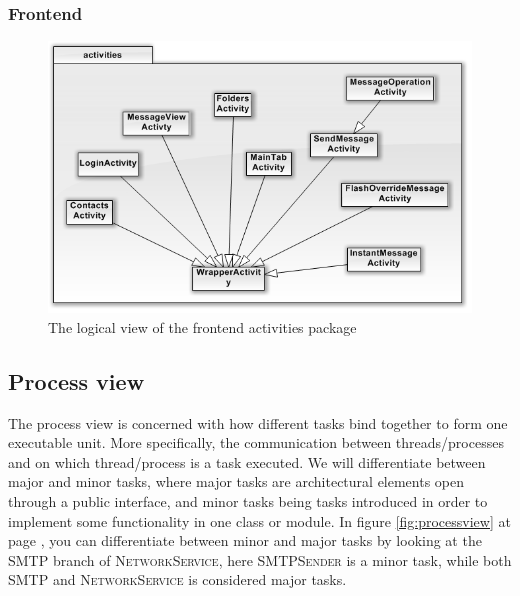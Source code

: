 \subsubsection{Frontend}
	\begin{figure}[H]
		\includegraphics[width=\textwidth]{FrontendClasses.png}
		\caption{The logical view of the frontend activities package}
		\label{fig:logicalfrontpackview}
	\end{figure}	
	
\subsection{Process view}
The process view is concerned with how different tasks bind together to form one executable unit. More specifically, the communication between threads/processes and on which thread/process is a task executed. We will differentiate between major and minor tasks, where major tasks are architectural elements open through a public interface, and minor tasks being tasks introduced in order to implement some functionality in one class or module.
In figure \ref{fig:processview} at page \pageref{fig:processview}, you can differentiate between minor and major tasks by looking at the \textsc{SMTP} branch of \textsc{NetworkService}, here \textsc{SMTPSender} is a minor task, while both \textsc{SMTP} and \textsc{NetworkService} is considered major tasks. 

